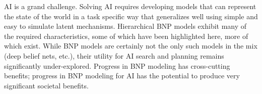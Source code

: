 \documentclass[12pt]{article}
\begin{document}
\noindent AI is a grand challenge.  Solving AI requires developing models that can represent the state of the world in a task specific way that generalizes well using simple and easy to simulate latent mechanisms.  Hierarchical BNP models exhibit many of the required characteristics, some of which have been highlighted here, more of which exist.  While BNP models are certainly not the only such models in the mix (deep belief nets, etc.), their utility for AI search and planning remains significantly under-explored.  Progress in BNP modeling has cross-cutting benefits; progress in BNP modeling for AI has the potential to produce very significant societal benefits.


\end{document}
